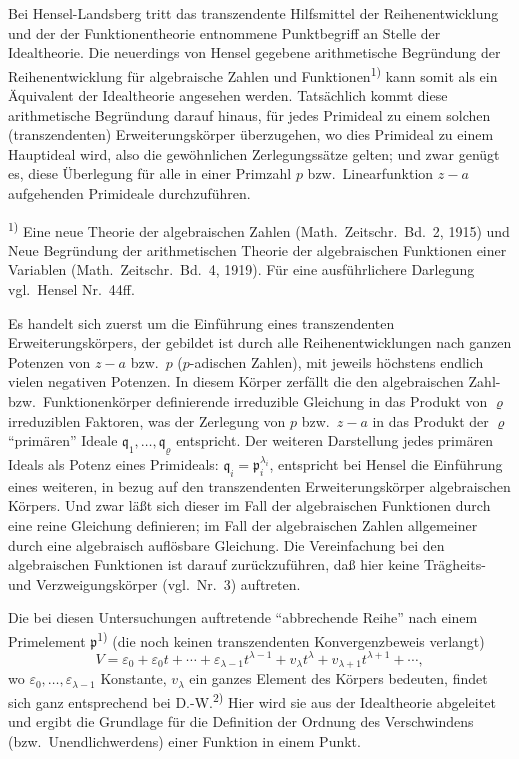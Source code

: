 \documentclass[12pt,a4paper]{article}
\begin{document}
Bei Hensel-Landsberg tritt das transzendente Hilfsmittel der Reihenentwicklung und der der Funktionentheorie entnommene Punktbegriff an Stelle der Idealtheorie. Die neuerdings von Hensel gegebene arithmetische Begr\"undung der Reihenentwicklung f\"ur algebraische Zahlen und Funktionen\textsuperscript{1)} kann somit als ein \"Aquivalent der Idealtheorie angesehen werden. Tats\"achlich kommt diese arithmetische Begr\"undung darauf hinaus, f\"ur jedes Primideal zu einem solchen (transzendenten) Erweiterungsk\"orper \"uberzugehen, wo dies Primideal zu einem Hauptideal wird, also die gew\"ohnlichen Zerlegungss\"atze gelten; und zwar gen\"ugt es, diese \"Uberlegung f\"ur alle in einer Primzahl $p$ bzw.\ Linearfunktion $z-a$ aufgehenden Primideale durchzuf\"uhren.

\smallskip
\noindent\textsuperscript{1)} Eine neue Theorie der algebraischen Zahlen (Math.\ Zeitschr.\ Bd.\ 2, 1915) und Neue Begr\"undung der arithmetischen Theorie der algebraischen Funktionen einer Variablen (Math.\ Zeitschr.\ Bd.\ 4, 1919). F\"ur eine ausf\"uhrlichere Darlegung vgl.\ Hensel Nr.\ 44ff.

Es handelt sich zuerst um die Einf\"uhrung eines transzendenten Erweiterungsk\"orpers, der gebildet ist durch alle Reihenentwicklungen nach ganzen Potenzen von $z-a$ bzw.\ $p$ ($p$-adischen Zahlen), mit jeweils h\"ochstens endlich vielen negativen Potenzen. In diesem K\"orper zerf\"allt die den algebraischen Zahl- bzw.\ Funktionenk\"orper definierende irreduzible Gleichung in das Produkt von $\varrho$ irreduziblen Faktoren, was der Zerlegung von $p$ bzw.\ $z-a$ in das Produkt der $\varrho$ ``prim\"aren'' Ideale $\mathfrak{q}_{1},\ldots,\mathfrak{q}_{\varrho}$ entspricht. Der weiteren Darstellung jedes prim\"aren Ideals als Potenz eines Primideals: $\mathfrak{q}_{i}=\mathfrak{p}_{i}^{\lambda_{i}}$, entspricht bei Hensel die Einf\"uhrung eines weiteren, in bezug auf den transzendenten Erweiterungsk\"orper algebraischen K\"orpers. Und zwar l\"a\ss{}t sich dieser im Fall der algebraischen Funktionen durch eine reine Gleichung definieren; im Fall der algebraischen Zahlen allgemeiner durch eine algebraisch aufl\"osbare Gleichung. Die Vereinfachung bei den algebraischen Funktionen ist darauf zur\"uckzuf\"uhren, da\ss{} hier keine Tr\"agheits- und Verzweigungsk\"orper (vgl.\ Nr.\ 3) auftreten.

Die bei diesen Untersuchungen auftretende ``abbrechende Reihe'' nach einem Primelement $\mathfrak{p}$\textsuperscript{1)} (die noch keinen transzendenten Konvergenzbeweis verlangt)
\[
V=\varepsilon_{0}+\varepsilon_{0}t+\cdots+\varepsilon_{\lambda-1}t^{\lambda-1}+v_{\lambda}t^{\lambda}+v_{\lambda+1}t^{\lambda+1}+\cdots,
\]
wo $\varepsilon_{0},\ldots,\varepsilon_{\lambda-1}$ Konstante, $v_{\lambda}$ ein ganzes Element des K\"orpers bedeuten, findet sich ganz entsprechend bei D.-W.\textsuperscript{2)} Hier wird sie aus der Idealtheorie abgeleitet und ergibt die Grundlage f\"ur die Definition der Ordnung des Verschwindens (bzw.\ Unendlichwerdens) einer Funktion in einem Punkt.
\end{document}
